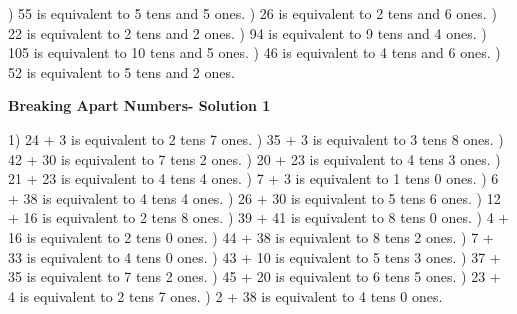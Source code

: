 \documentclass{article}%
\begin{document}
) 55 is equivalent to  5 tens and 5 ones.%
) 26 is equivalent to  2 tens and 6 ones.%
) 22 is equivalent to  2 tens and 2 ones.%
) 94 is equivalent to  9 tens and 4 ones.%
) 105 is equivalent to  10 tens and 5 ones.%
) 46 is equivalent to  4 tens and 6 ones.%
) 52 is equivalent to  5 tens and 2 ones.%
\newline%
\newpage%
\large%
\begin{center}%
\textbf{Breaking Apart Numbers- Solution 1}%
\newline%
\end{center} \normalsize%
1) 24 + 3 is equivalent to 2 tens 7 ones.%
) 35 + 3 is equivalent to 3 tens 8 ones.%
) 42 + 30 is equivalent to 7 tens 2 ones.%
) 20 + 23 is equivalent to 4 tens 3 ones.%
) 21 + 23 is equivalent to 4 tens 4 ones.%
) 7 + 3 is equivalent to 1 tens 0 ones.%
) 6 + 38 is equivalent to 4 tens 4 ones.%
) 26 + 30 is equivalent to 5 tens 6 ones.%
) 12 + 16 is equivalent to 2 tens 8 ones.%
) 39 + 41 is equivalent to 8 tens 0 ones.%
) 4 + 16 is equivalent to 2 tens 0 ones.%
) 44 + 38 is equivalent to 8 tens 2 ones.%
) 7 + 33 is equivalent to 4 tens 0 ones.%
) 43 + 10 is equivalent to 5 tens 3 ones.%
) 37 + 35 is equivalent to 7 tens 2 ones.%
) 45 + 20 is equivalent to 6 tens 5 ones.%
) 23 + 4 is equivalent to 2 tens 7 ones.%
) 2 + 38 is equivalent to 4 tens 0 ones.%
\newline%
\end{document}
